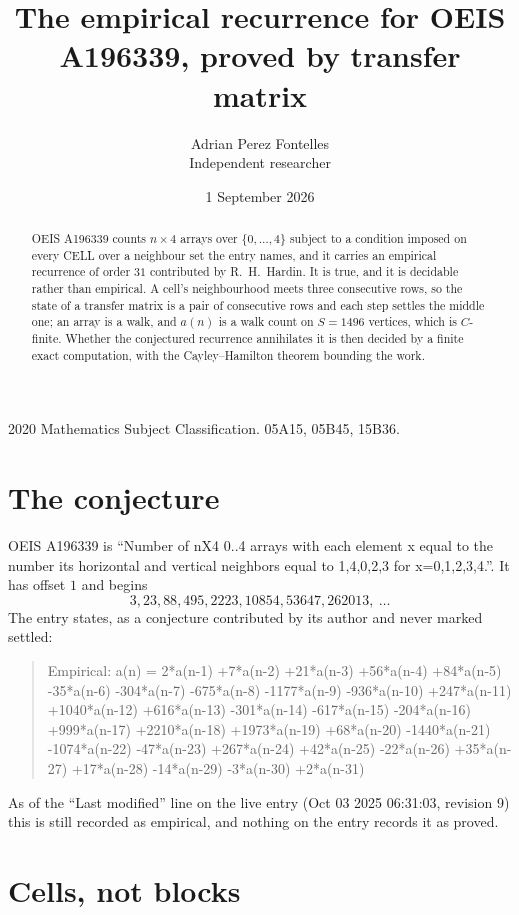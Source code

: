 \documentclass[11pt,a4paper]{article}
\title{The empirical recurrence for OEIS A196339, proved by transfer matrix}
\author{Adrian Perez Fontelles\\ \small Independent researcher}
\date{1 September 2026}
\theoremstyle{plain}
\theoremstyle{definition}
\begin{document}
\maketitle

\begin{abstract}
OEIS A196339 counts $n\times4$ arrays over $\{0,\dots,4\}$ subject to a condition imposed on
every CELL over a neighbour set the entry names, and it carries an empirical recurrence of
order $31$ contributed by R.~H.~Hardin. It is true, and it is decidable rather than
empirical. A cell's neighbourhood meets three consecutive rows, so the state of a transfer
matrix is a pair of consecutive rows and each step settles the middle one; an array is a
walk, and $a(n)$ is a walk count on $S=1496$ vertices, which is $C$-finite. Whether the
conjectured recurrence annihilates it is then decided by a finite exact computation, with the
Cayley--Hamilton theorem bounding the work.
\end{abstract}

\noindent\small 2020 Mathematics Subject Classification. 05A15, 05B45, 15B36.\normalsize

\section{The conjecture}

OEIS A196339 is ``Number of nX4 0..4 arrays with each element x equal to the number its horizontal and vertical neighbors equal to 1,4,0,2,3 for x=0,1,2,3,4.''. It has offset $1$ and begins
\[
3, 23, 88, 495, 2223, 10854, 53647, 262013,\ \dots
\]
The entry states, as a conjecture contributed by its author and never marked settled:
\begin{quote}
Empirical: a(n) = 2*a(n-1) +7*a(n-2) +21*a(n-3) +56*a(n-4) +84*a(n-5) -35*a(n-6) -304*a(n-7) -675*a(n-8) -1177*a(n-9) -936*a(n-10) +247*a(n-11) +1040*a(n-12) +616*a(n-13) -301*a(n-14) -617*a(n-15) -204*a(n-16) +999*a(n-17) +2210*a(n-18) +1973*a(n-19) +68*a(n-20) -1440*a(n-21) -1074*a(n-22) -47*a(n-23) +267*a(n-24) +42*a(n-25) -22*a(n-26) +35*a(n-27) +17*a(n-28) -14*a(n-29) -3*a(n-30) +2*a(n-31)
\end{quote}
As of the ``Last modified'' line on the live entry (Oct 03 2025 06:31:03, revision 9) this is still
recorded as empirical, and nothing on the entry records it as proved.

\section{Cells, not blocks}
\end{document}
